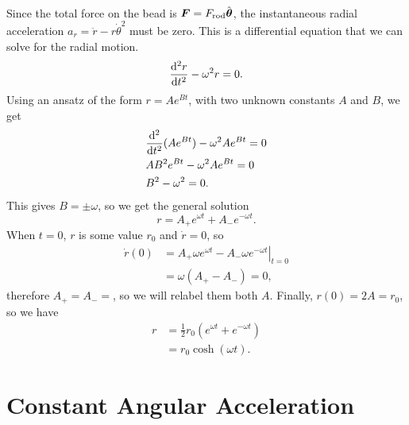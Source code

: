 \documentclass[../classical_mechanics.tex]{subfiles}
\begin{document}
\begin{example}
            \paragraph{}
            Since the total force on the bead is $\boldsymbol{F}=F_\text{rod}\hat{\boldsymbol{\theta}}$, the instantaneous radial acceleration $a_r=\ddot{r}-r\dot{\theta}^2$ must be zero.
            This is a differential equation that we can solve for the radial motion.
            \begin{equation}
                \dv[2]{r}{t}-\omega^2r=0.
            \end{equation}
            Using an ansatz of the form $r=Ae^{Bt}$, with two unknown constants $A$ and $B$, we get
            \begin{align}
                &\dv[2]{}{t}(Ae^{Bt})-\omega^2Ae^{Bt}=0\\
                &AB^2e^{Bt}-\omega^2Ae^{Bt}=0\\
                &B^2-\omega^2=0.
            \end{align}
            This gives $B=\pm\omega$, so we get the general solution
            \begin{equation}
                r=A_+e^{\omega t}+A_-e^{-\omega t}.
            \end{equation}
            When $t=0$, $r$ is some value $r_0$ and $\dot{r}=0$, so
            \begin{align}
                \dot{r}(0)&=\left.A_+\omega e^{\omega t}-A_-\omega e^{-\omega t}\right|_{t=0}\\
                &=\omega(A_+-A_-)=0,
            \end{align}
            therefore $A_+=A_-=$, so we will relabel them both $A$.
            Finally, $r(0)=2A=r_0$, so we have
            \begin{align}
                r&=\frac{1}{2}r_0(e^{\omega t}+e^{-\omega t})\\
                &=r_0\cosh(\omega t).
            \end{align}
        \end{example}

    \section{Constant Angular Acceleration}
\end{document}
